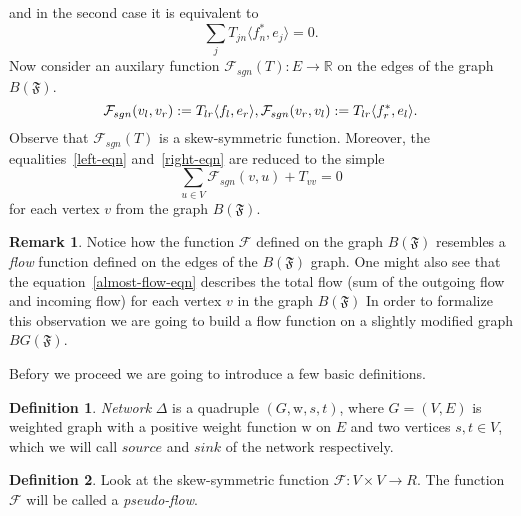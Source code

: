 \documentclass[12pt]{article}
\theoremstyle{definition}
\newtheorem{remark}{Remark}
\newtheorem{definition}{Definition}
\newcommand{\fsys}{\mathfrak{F}}
\newcommand{\wt}{\mathrm{w}}
\newcommand{\flow}{\mathcal{F}}
\newcommand{\flowsgn}{\mathcal{F}_{sgn}}
\newcommand{\source}{\mathit{source}}
\newcommand{\sink}{\mathit{sink}}
\newcommand{\net}{\Delta}
\numberwithin{remark}{section}
\numberwithin{theorem}{section}
\numberwithin{prop}{section}
\numberwithin{equation}{section}
\numberwithin{lemma}{section}
\numberwithin{prop_under_lemma}{lemma}
\begin{document}
    and in the second case it is equivalent to 
    \begin{equation}
        \label{right-eqn}
        \sum_j T_{jn} \langle f^*_n, e_j \rangle = 0.
    \end{equation}
    Now consider an auxilary function $\flowsgn(T): E \to \mathbb{R}$ 
    on the edges of the graph $B(\fsys)$.
    \begin{equation*}
        \flowsgn(v_l, v_r) := T_{lr} \langle f_l, e_r \rangle,\\
        \flowsgn(v_r, v_l) := T_{lr} \langle f^*_r, e_l \rangle.
    \end{equation*}
    Observe that $\flowsgn(T)$ is a skew-symmetric function.
    Moreover, the equalities~\eqref{left-eqn} and~\eqref{right-eqn} are reduced to the simple
    \begin{equation}
      \label{almost-flow-eqn}
      \sum_{u \in V} \flowsgn(v, u) + T_{vv} = 0
    \end{equation}
    for each vertex $v$ from the graph $B(\fsys)$.
    \begin{remark}
      Notice how the function $\flow$ defined on the graph $B(\fsys)$ resembles
      a \emph{flow} function defined on the edges of the $B(\fsys)$ graph.
      One might also see that the equation~\eqref{almost-flow-eqn} describes the total flow (sum of the outgoing flow and incoming flow) 
      for each vertex $v$ in the graph $B(\fsys)$
      In order to formalize this observation we are going to build a flow function
      on a slightly modified graph $BG(\fsys)$.
    \end{remark}
    Befory we proceed we are going to introduce a few basic definitions.
    \begin{definition}
        \textit{Network} $\net$ is a quadruple $(G, \wt, s, t)$, where $G = (V, E)$ is weighted graph 
        with a positive weight function $\wt$ on $E$ and two vertices $s, t \in V$, which
        we will call $\source$ and $\sink$ of the network respectively.
    \end{definition}
    \begin{definition}
        Look at the skew-symmetric function $\flow: V \times V \to R$.
        The function $\flow$ will be called a \textit{pseudo-flow}.
    \end{definition}
\end{document}
